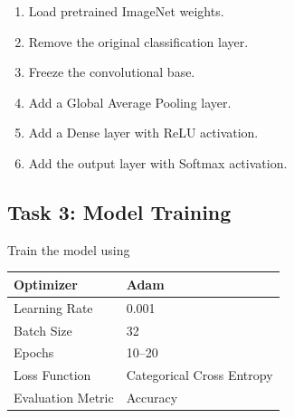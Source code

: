 \documentclass[11pt]{article}
\begin{document}
\begin{enumerate}

\item Load pretrained ImageNet weights.

\item Remove the original classification layer.

\item Freeze the convolutional base.

\item Add a Global Average Pooling layer.

\item Add a Dense layer with ReLU activation.

\item Add the output layer with Softmax activation.

\end{enumerate}


\subsection*{Task 3: Model Training}

Train the model using

\begin{center}

\begin{tabular}{|p{5cm}|p{6cm}|}

\hline

Optimizer & Adam\\

\hline

Learning Rate & 0.001\\

\hline

Batch Size & 32\\

\hline

Epochs & 10--20\\

\hline

Loss Function &
Categorical Cross Entropy\\

\hline

Evaluation Metric &
Accuracy\\

\hline

\end{tabular}

\end{center}
\end{document}
